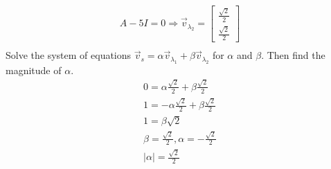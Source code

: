 \documentclass[11pt]{article}
\newenvironment{qparts}{\begin{enumerate}[{(}a{)}]}{\end{enumerate}}
\begin{document}
\begin{qparts}
\begin{align*}
    A-5I = 0 \Longrightarrow \vec{v}_{\lambda_2} = \begin{bmatrix}\frac{\sqrt{2}}{2}\\\frac{\sqrt{2}}{2}\end{bmatrix}\\
\end{align*}
Solve the system of equations $\vec{v}_s = \alpha \vec{v}_{\lambda_1} + \beta  \vec{v}_{\lambda_2}$ for $\alpha$ and $\beta$. Then find the magnitude of $\alpha$.
\begin{align*}
    0 = \alpha \frac{\sqrt{2}}{2} + \beta \frac{\sqrt{2}}{2} \\
    1 = - \alpha \frac{\sqrt{2}}{2} + \beta \frac{\sqrt{2}}{2} \\
    1 = \beta \sqrt{2} \\
    \beta = \frac{\sqrt{2}}{2}, \alpha = -\frac{\sqrt{2}}{2} \\
    |\alpha| = \frac{\sqrt{2}}{2}
\end{align*}
\end{qparts}


\newpage
\end{document}
